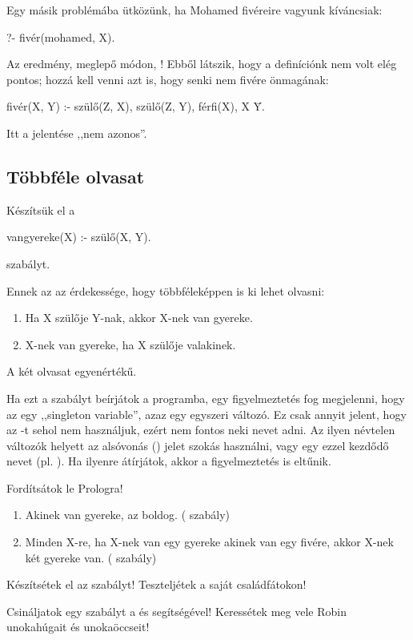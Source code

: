 Egy másik problémába ütközünk, ha Mohamed fivéreire vagyunk kíváncsiak:
\begin{query}
?- fivér(mohamed, X).
\end{query}
Az eredmény, meglepő módon, ! Ebből látszik, hogy a definíciónk nem volt elég pontos; hozzá kell venni azt is, hogy senki nem fivére önmagának:
\begin{program}
fivér(X, Y) :- szülő(Z, X), szülő(Z, Y), férfi(X), X \= Y.
\end{program}
Itt a \pr{\textbackslash=} jelentése ,,nem azonos''.

\subsection*{Többféle olvasat}

Készítsük el a
\begin{program}
vangyereke(X) :- szülő(X, Y).
\end{program}
szabályt.

Ennek az az érdekessége, hogy többféleképpen is ki lehet olvasni:

\begin{enumerate}
\item Ha X szülője Y-nak, akkor X-nek van gyereke.
\item X-nek van gyereke, ha X szülője valakinek.
\end{enumerate}
A két olvasat egyenértékű.

Ha ezt a szabályt beírjátok a programba, egy figyelmeztetés fog megjelenni, hogy az  egy ,,singleton variable'', azaz egy egyszeri változó. Ez csak annyit jelent, hogy az -t sehol nem használjuk, ezért nem fontos neki nevet adni. Az ilyen névtelen változók helyett az alsóvonás (\pr{\_}) jelet szokás használni, vagy egy ezzel kezdődő nevet (pl. ). Ha ilyenre átírjátok, akkor a figyelmeztetés is eltűnik.

\begin{problem}
Fordítsátok le Prologra!
\begin{enumerate}  
\item Akinek van gyereke, az boldog. ( szabály)
\item Minden X-re, ha X-nek van egy gyereke akinek van egy fivére, akkor X-nek két gyereke van. ( szabály)
\end{enumerate}
\end{problem}
\begin{problem}
  Készítsétek el az  szabályt! Teszteljétek a saját családfátokon!
\end{problem}
\begin{problem}
  Csináljatok egy  szabályt a  és  segítségével! Keressétek meg vele Robin unokahúgait és unokaöccseit!
\end{problem}

